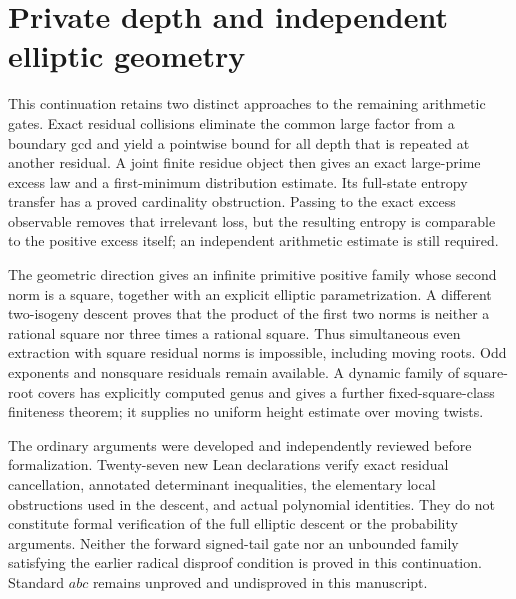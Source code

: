 \section{Private depth and independent elliptic geometry}
\label{sec:private-geometry-checkpoint}

This continuation retains two distinct approaches to the remaining
arithmetic gates.  Exact residual collisions eliminate the common large
factor from a boundary gcd and yield a pointwise bound for all depth that
is repeated at another residual.  A joint finite residue object then gives
an exact large-prime excess law and a first-minimum distribution estimate.
Its full-state entropy transfer has a proved cardinality obstruction.
Passing to the exact excess observable removes that irrelevant loss, but
the resulting entropy is comparable to the positive excess itself; an
independent arithmetic estimate is still required.

The geometric direction gives an infinite primitive positive family whose
second norm is a square, together with an explicit elliptic parametrization.
A different two-isogeny descent proves that the product of the first two
norms is neither a rational square nor three times a rational square.
Thus simultaneous even extraction with square residual norms is impossible,
including moving roots.  Odd exponents and nonsquare residuals remain
available.  A dynamic family of square-root covers has explicitly computed
genus and gives a further fixed-square-class finiteness theorem; it supplies
no uniform height estimate over moving twists.

The ordinary arguments were developed and independently reviewed before
formalization.  Twenty-seven new Lean declarations verify exact residual
cancellation, annotated determinant inequalities, the elementary local
obstructions used in the descent, and actual polynomial identities.  They
do not constitute formal verification of the full elliptic descent or the
probability arguments.  Neither the forward signed-tail gate nor an
unbounded family satisfying the earlier radical disproof condition is
proved in this continuation.  Standard $abc$ remains unproved and undisproved
in this manuscript.
